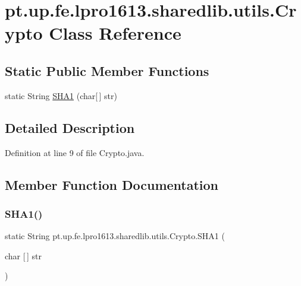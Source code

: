 \hypertarget{classpt_1_1up_1_1fe_1_1lpro1613_1_1sharedlib_1_1utils_1_1_crypto}{}\section{pt.\+up.\+fe.\+lpro1613.\+sharedlib.\+utils.\+Crypto Class Reference}
\label{classpt_1_1up_1_1fe_1_1lpro1613_1_1sharedlib_1_1utils_1_1_crypto}
\subsection*{Static Public Member Functions}
\begin{DoxyCompactItemize}
\item 
static String \hyperlink{classpt_1_1up_1_1fe_1_1lpro1613_1_1sharedlib_1_1utils_1_1_crypto_a138c47b584355a3e915664a72a578bf9}{S\+H\+A1} (char\mbox{[}$\,$\mbox{]} str)
\end{DoxyCompactItemize}


\subsection{Detailed Description}


Definition at line 9 of file Crypto.\+java.



\subsection{Member Function Documentation}
\hypertarget{classpt_1_1up_1_1fe_1_1lpro1613_1_1sharedlib_1_1utils_1_1_crypto_a138c47b584355a3e915664a72a578bf9}{}\label{classpt_1_1up_1_1fe_1_1lpro1613_1_1sharedlib_1_1utils_1_1_crypto_a138c47b584355a3e915664a72a578bf9} 
\subsubsection{\texorpdfstring{S\+H\+A1()}{SHA1()}}
{\footnotesize\ttfamily static String pt.\+up.\+fe.\+lpro1613.\+sharedlib.\+utils.\+Crypto.\+S\+H\+A1 (\begin{DoxyParamCaption}\item[{char \mbox{[}$\,$\mbox{]}}]{str }\end{DoxyParamCaption})\hspace{0.3cm}{\ttfamily [static]}}

